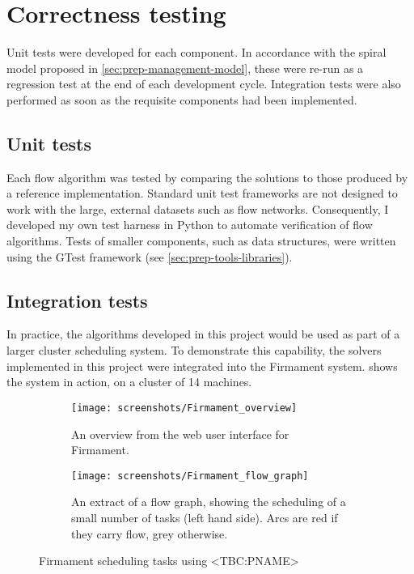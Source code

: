 \section{Correctness testing}



Unit tests were developed for each component. In accordance with the spiral model proposed in \cref{sec:prep-management-model}, these were re-run as a regression test at the end of each development cycle. Integration tests were also performed as soon as the requisite components had been implemented.

\subsection{Unit tests} \label{sec:eval-testing-unit}

Each flow algorithm was tested by comparing the solutions to those produced by a reference implementation. Standard unit test frameworks are not designed to work with the large, external datasets such as flow networks. Consequently, I developed my own test harness in Python to automate verification of flow algorithms. Tests of smaller components, such as data structures, were written using the GTest framework (see \cref{sec:prep-tools-libraries}).

\subsection{Integration tests} \label{sec:eval-test-integration}

In practice, the algorithms developed in this project would be used as part of a larger cluster scheduling system. To demonstrate this capability, the solvers implemented in this project were integrated into the Firmament system.  shows the system in action, on a cluster of 14 machines.

\begin{figure}
    \begin{subfigure}{\textwidth}
        \texttt{[image: screenshots/Firmament\_overview]}
        \caption{An overview from the web user interface for Firmament.}
    \end{subfigure}
    \begin{subfigure}{\textwidth}
        \texttt{[image: screenshots/Firmament\_flow\_graph]}
        \caption{An extract of a flow graph, showing the scheduling of a small number of tasks (left hand side). Arcs are {\color{red} red} if they carry flow, {\color{gray} grey} otherwise.}
    \end{subfigure}
    \caption[Firmament scheduling tasks]{Firmament scheduling tasks using <TBC:PNAME>}
    \label{fig:firmament-ui}
\end{figure}

